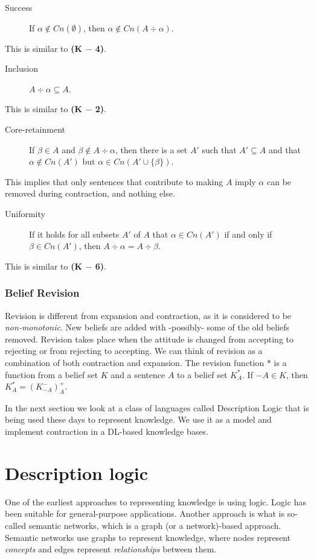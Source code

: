\begin{description}
\item[Success] If $\alpha \notin Cn(\emptyset)$, then $\alpha \notin Cn(A \div \alpha)$.
\end{description}
This is similar to \textbf{(K $-$ 4)}.

\begin{description}
\item[Inclusion] $A \div \alpha \subseteq A$.
\end{description}
This is similar to \textbf{(K $-$ 2)}.

\begin{description}
\item[Core-retainment] If $\beta \in A$ and $\beta \notin A \div \alpha$, then there is a set $A'$ such that $A' \subseteq A$ and that $\alpha \notin Cn(A')$ but $\alpha \in Cn(A' \cup \{ \beta \})$.
\end{description}
This implies that only sentences that contribute to making $A$ imply $\alpha$ can be removed during contraction, and nothing else. 

\begin{description}
\item[Uniformity] If it holds for all subsets $A'$ of $A$ that $\alpha \in Cn(A')$ if and only if $\beta \in Cn(A')$, then $A \div \alpha = A \div \beta$.
\end{description}
This is similar to \textbf{(K $-$ 6)}.

\subsubsection{Belief Revision}
Revision is different from expansion and contraction, as it is considered to be \textit{non-monotonic}. New beliefs are added with -possibly- some of the old beliefs removed. Revision takes place when the attitude is changed from accepting to rejecting or from rejecting to accepting. We can think of revision as a combination of both contraction and expansion. The revision function $*$ is a function from a belief set $K$ and a sentence $A$ to a belief set $K^{*}_{A}$. If $-A \in K$, then $K^{*}_{A} = (K^{-}_{-A})^{+}_{A}$.

In the next section we look at a class of languages called Description Logic that is being used these days to represent knowledge. We use it as a model and implement contraction in a DL-based knowledge bases.


\section{Description logic}
\label{dl}
One of the earliest approaches to representing knowledge is using logic. Logic has been suitable for general-purpose applications. Another approach is what is so-called semantic networks, which is a graph (or a network)-based approach. Semantic networks use graphs to represent knowledge\cite{dl}, where nodes represent \textit{concepts} and edges represent \textit{relationships} between them.


